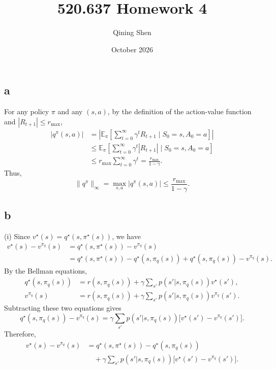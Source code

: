\documentclass{article}
\title{520.637 Homework 4}
\author{Qining Shen}
\date{October 2026}
\begin{document}
\maketitle

\section{}
\subsection*{a}
For any policy $\pi$ and any $(s,a)$, by the definition of the action-value function and $|R_{t+1}|\leq r_{\max}$,
\[
\begin{aligned}
|q^\pi(s,a)|
&=\left|\mathbb{E}_\pi\left[\sum_{t=0}^{\infty}\gamma^t R_{t+1}\mid S_0=s,A_0=a\right]\right|\\
&\leq\mathbb{E}_\pi\left[\sum_{t=0}^{\infty}\gamma^t |R_{t+1}|\mid S_0=s,A_0=a\right]\\
&\leq r_{\max}\sum_{t=0}^{\infty}\gamma^t
=\frac{r_{\max}}{1-\gamma}.
\end{aligned}
\]
Thus,
\[
\|q^\pi\|_\infty=\max_{s,a}|q^\pi(s,a)|\leq\frac{r_{\max}}{1-\gamma}.
\]

\subsection*{b}
\noindent (i) Since $v^\star(s)=q^\star(s,\pi^\star(s))$, we have
\[
\begin{aligned}
v^\star(s)-v^{\pi_q}(s)
&=q^\star(s,\pi^\star(s))-v^{\pi_q}(s)\\
&=q^\star(s,\pi^\star(s))-q^\star(s,\pi_q(s))
 +q^\star(s,\pi_q(s))-v^{\pi_q}(s).
\end{aligned}
\]
By the Bellman equations,
\[
\begin{aligned}
q^\star(s,\pi_q(s))
&=r(s,\pi_q(s))+\gamma\sum_{s'}p(s'|s,\pi_q(s))v^\star(s'),\\
v^{\pi_q}(s)
&=r(s,\pi_q(s))+\gamma\sum_{s'}p(s'|s,\pi_q(s))v^{\pi_q}(s').
\end{aligned}
\]
Subtracting these two equations gives
\[
q^\star(s,\pi_q(s))-v^{\pi_q}(s)
=\gamma\sum_{s'}p(s'|s,\pi_q(s))
\bigl[v^\star(s')-v^{\pi_q}(s')\bigr].
\]
Therefore,
\[
\begin{aligned}
v^\star(s)-v^{\pi_q}(s)
&=q^\star(s,\pi^\star(s))-q^\star(s,\pi_q(s))\\
&\quad+\gamma\sum_{s'}p(s'|s,\pi_q(s))
\bigl[v^\star(s')-v^{\pi_q}(s')\bigr].
\end{aligned}
\]
\end{document}
